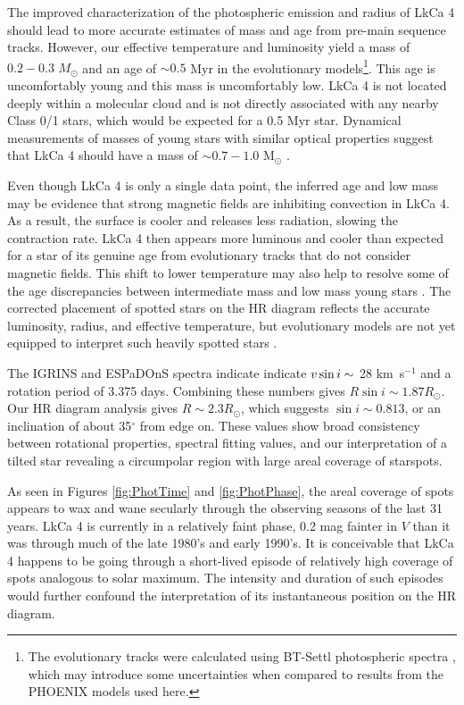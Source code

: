 \documentclass[twocolumn]{emulateapj}%
\begin{document}
The improved characterization of the photospheric emission and radius of LkCa 4 should lead to more accurate estimates of mass and age from pre-main sequence tracks.  However, our effective temperature and luminosity yield a mass of $0.2-0.3$ $M_\odot$ and an age of $\sim 0.5$ Myr in the \citet{baraffe15} evolutionary models\footnote{The \citet{baraffe15} evolutionary tracks were calculated using BT-Settl photospheric spectra \citep{allard14}, which may introduce some uncertainties when compared to results from the PHOENIX models used here.}.  This age is uncomfortably young and this mass is uncomfortably low.  LkCa 4 is not located deeply within a molecular cloud and is not directly associated with any nearby Class 0/1 stars, which would be expected for a 0.5 Myr star.  Dynamical measurements of masses of young stars with similar optical properties suggest that LkCa 4 should have a mass of $\sim 0.7-1.0$ M$_\odot$ \citep[e.g.][]{guilloteau14,czekala16,rizzuto16}.

Even though LkCa 4 is only a single data point, the inferred age and low mass may be evidence that strong magnetic fields are inhibiting convection in LkCa 4.  As a result, the surface is cooler and releases less radiation, slowing the contraction rate.  LkCa 4 then appears more luminous and cooler than expected for a star of its genuine age from evolutionary tracks that do not consider magnetic fields.   This shift to lower temperature may also help to resolve some of the age discrepancies between intermediate mass and low mass young stars \citep[e.g.][]{herczeg15}.  The corrected placement of spotted stars on the HR diagram reflects the accurate luminosity, radius, and effective temperature, but evolutionary models are not yet equipped to interpret such heavily spotted stars \citep{somers15}.

The IGRINS and ESPaDOnS spectra indicate indicate $v \sin i\sim$ 28 km~s$^{-1}$ and a rotation period of 3.375 days. Combining these numbers gives $R\sin{i} \sim 1.87 R_{\odot}$. Our HR diagram analysis gives $R \sim 2.3R_{\odot}$, which suggests  $\sin{i} \sim 0.813$, or an inclination of about 35$^{\circ}$ from edge on. These values show broad consistency between rotational properties, spectral fitting values, and our interpretation of a tilted star revealing a circumpolar region with large areal coverage of starspots.

As seen in Figures \ref{fig:PhotTime} and \ref{fig:PhotPhase}, the areal coverage of spots appears to wax and wane secularly through the observing seasons of the last 31 years.  LkCa 4 is currently in a relatively faint phase, 0.2 mag fainter in $V$ than it was through much of the late 1980's and early 1990's.  It is conceivable that LkCa 4 happens to be going through a short-lived episode of relatively high coverage of spots analogous to solar maximum.  The intensity and duration of such episodes would further confound the interpretation of its instantaneous position on the HR diagram.
\end{document}

